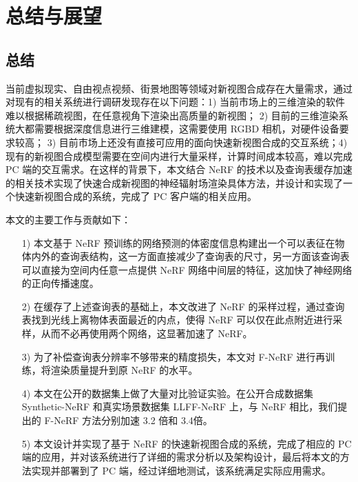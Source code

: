 \chapter{总结与展望}
\section{总结}
当前虚拟现实、自由视点视频、街景地图等领域对新视图合成存在大量需求，通过对现有的相关系统进行调研发现存在以下问题：1) 当前市场上的三维渲染的软件难以根据稀疏视图，在任意视角下渲染出高质量的新视图；
2) 目前的三维渲染系统大都需要根据深度信息进行三维建模，这需要使用 RGBD 相机，对硬件设备要求较高；
3) 目前市场上还没有直接可应用的面向快速新视图合成的交互系统；4) 现有的新视图合成模型需要在空间内进行大量采样，计算时间成本较高，难以完成 PC 端的交互需求。在这样的背景下，本文结合 NeRF 的技术以及查询表缓存加速的相关技术实现了快速合成新视图的神经辐射场渲染具体方法，并设计和实现了一个快速新视图合成的系统，完成了 PC 客户端的相关应用。

本文的主要工作与贡献如下：

\begin{enumerate}
	\item [1)] 本文基于 NeRF 预训练的网络预测的体密度信息构建出一个可以表征在物体内外的查询表结构，这一方面直接减少了查询表的尺寸，另一方面该查询表可以直接为空间内任意一点提供 NeRF 网络中间层的特征，这加快了神经网络的正向传播速度。
	\item [2)] 在缓存了上述查询表的基础上，本文改进了 NeRF 的采样过程，通过查询表找到光线上离物体表面最近的内点，使得 NeRF 可以仅在此点附近进行采样，从而不必再使用两个网络，这显著加速了 NeRF。
	\item [3)] 为了补偿查询表分辨率不够带来的精度损失，本文对 F-NeRF 进行再训练，将渲染质量提升到原 NeRF 的水平。
	\item [4)] 本文在公开的数据集上做了大量对比验证实验。在公开合成数据集 Synthetic-NeRF 和真实场景数据集 LLFF-NeRF 上，与 NeRF 相比，我们提出的 F-NeRF 方法分别加速 3.2 倍和 3.4倍。 
	\item [5)] 本文设计并实现了基于 NeRF 的快速新视图合成的系统，完成了相应的 PC 端的应用，并对该系统进行了详细的需求分析以及架构设计，最后将本文的方法实现并部署到了 PC 端，经过详细地测试，该系统满足实际应用需求。
\end{enumerate}


